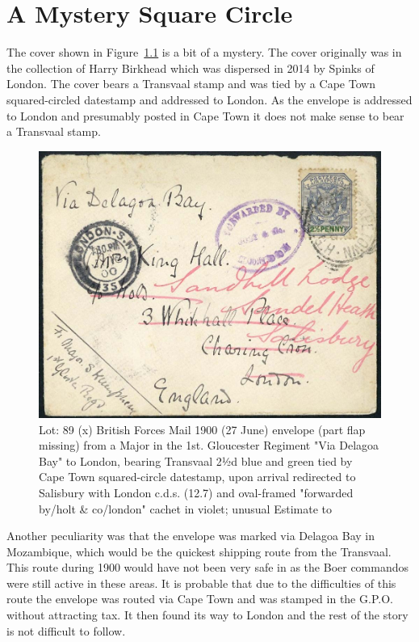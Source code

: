 \chapter{A Mystery Square Circle}
The cover shown in Figure~\ref{delagoa} is a bit of a mystery. The cover originally was in the collection of Harry Birkhead which was dispersed in 2014 by Spinks of London. The cover bears a Transvaal stamp and was tied by a Cape Town squared-circled datestamp and addressed to London. As the envelope is addressed to London and presumably posted in Cape Town it does not make sense to bear a Transvaal stamp. 

\begin{figure}
\includegraphics[width=1.0\textwidth]{../cape-of-good-hope/14018_89_1.jpg}
\caption{
Lot: 89 (x) British Forces Mail
1900 (27 June) envelope (part flap missing) from a Major in the 1st. Gloucester Regiment "Via Delagoa Bay" to London, bearing Transvaal 2½d blue and green tied by Cape Town squared-circle datestamp, upon arrival redirected to Salisbury with London c.d.s. (12.7) and oval-framed "forwarded by/holt & co/london" cachet in violet; unusual 
Estimate   to  }\label{delagoa}
\end{figure}

Another peculiarity was that the envelope was marked via Delagoa Bay in Mozambique, which would be the quickest shipping route from the Transvaal. This route during 1900 would have not been very safe in as the Boer commandos were still active in these areas. It is probable that due to the difficulties of this route the envelope was routed via Cape Town and was stamped in the G.P.O. without attracting tax. It then found its way to London and the rest of the story is not difficult to follow. 

